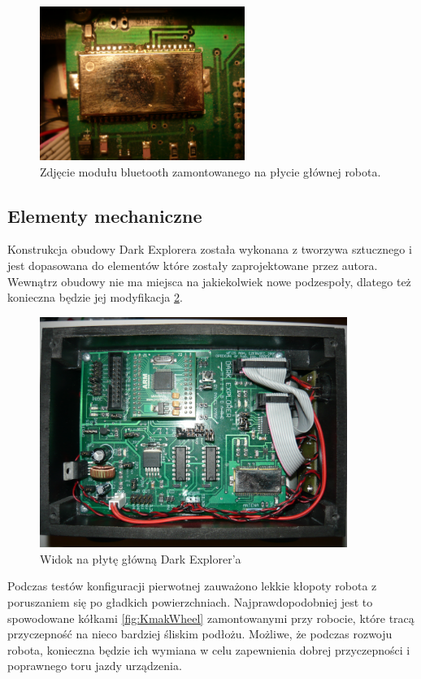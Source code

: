 \begin{figure}[!ht]
 \centering
 \includegraphics[height=50mm]{../images/ch02/btm-222.jpg}
 \caption{Zdjęcie modułu bluetooth zamontowanego na płycie głównej robota.}
 \label{fig:BTM222}
\end{figure}

\subsection{Elementy mechaniczne}
Konstrukcja obudowy Dark Explorera została wykonana z tworzywa sztucznego i jest dopasowana do elementów które zostały zaprojektowane przez autora. Wewnątrz obudowy nie ma miejsca na jakiekolwiek nowe podzespoły, dlatego też konieczna będzie jej modyfikacja \ref{fig:KmakMainBoard}.

\begin{figure}[!ht]
 \centering
 \includegraphics[height=75mm]{../images/ch02/main_board.jpg}
 \caption{Widok na płytę główną Dark Explorer'a}
 \label{fig:KmakMainBoard}
\end{figure}

Podczas testów konfiguracji pierwotnej zauważono lekkie kłopoty robota z poruszaniem się po gładkich powierzchniach. Najprawdopodobniej jest to spowodowane kółkami \ref{fig:KmakWheel} zamontowanymi przy robocie, które tracą przyczepność na nieco bardziej śliskim podłożu. Możliwe, że podczas rozwoju robota, konieczna będzie ich wymiana w celu zapewnienia dobrej przyczepności i poprawnego toru jazdy urządzenia.

